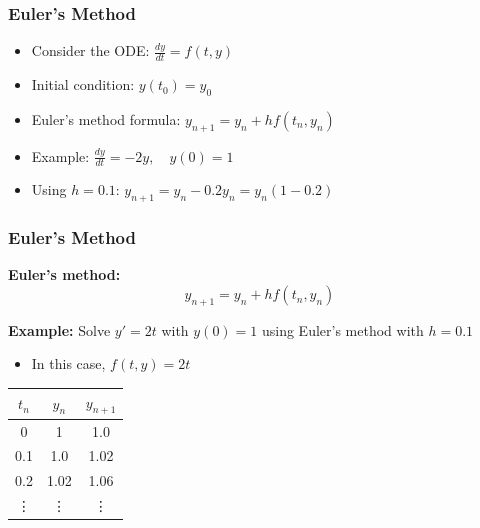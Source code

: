 \documentclass[aspectratio=169,xcolor=dvipsnames,svgnames,x11names,fleqn]{beamer}
\begin{document}
\begin{frame}
\frametitle{Euler's Method}
\begin{itemize}
    \item Consider the ODE: $ \frac{dy}{dt} = f(t, y) $
    \item Initial condition: $ y(t_0) = y_0 $
    \item Euler's method formula: $ y_{n+1} = y_n + h f(t_n, y_n) $
    \item Example: $ \frac{dy}{dt} = -2y, \quad y(0) = 1 $
    \item Using $ h = 0.1 $: $ y_{n+1} = y_n - 0.2y_n = y_n(1 - 0.2) $
\end{itemize}
\end{frame}

\begin{frame}
  \frametitle{Euler's Method}
  \textbf{Euler's method:}
  \begin{equation*}
    y_{n+1} = y_n + hf(t_n, y_n)
  \end{equation*}
  
  \textbf{Example:} Solve $y' = 2t$ with $y(0) = 1$ using Euler's method with $h = 0.1$
  \begin{itemize}
    \item In this case, $f(t, y) = 2t$
  \end{itemize}
  \begin{table}
    \begin{tabular}{c|c|c}
      $t_n$ & $y_n$ & $y_{n+1}$ \\
      \hline
      0 & 1 & 1.0 \\
      0.1 & 1.0 & 1.02 \\
      0.2 & 1.02 & 1.06 \\
      \vdots & \vdots & \vdots
    \end{tabular}
  \end{table}
\end{frame}
\end{document}
